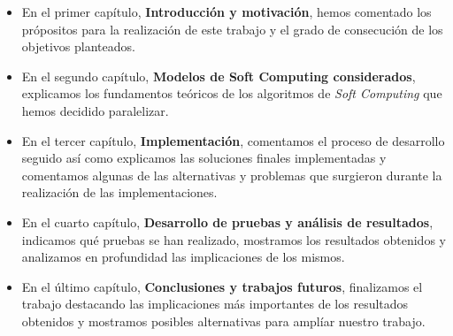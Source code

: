 \documentclass[a4paper,oneside,11pt,titlepage]{book}
\begin{document}
\begin{itemize}
    \item En el primer capítulo, \textbf{Introducción y motivación}, hemos comentado los própositos para la realización de este trabajo y el grado de consecución de los objetivos planteados.
    \item En el segundo capítulo, \textbf{Modelos de Soft Computing considerados}, explicamos los fundamentos teóricos de los algoritmos de \textit{Soft Computing} que hemos decidido paralelizar.
    \item En el tercer capítulo, \textbf{Implementación}, comentamos el proceso de desarrollo seguido así como explicamos las soluciones finales implementadas y comentamos algunas de las alternativas y problemas que surgieron durante la realización de las implementaciones.
    \item En el cuarto capítulo, \textbf{Desarrollo de pruebas y análisis de resultados}, indicamos qué pruebas se han realizado, mostramos los resultados obtenidos y analizamos en profundidad las implicaciones de los mismos.
    \item En el último capítulo, \textbf{Conclusiones y trabajos futuros}, finalizamos el trabajo destacando las implicaciones más importantes de los resultados obtenidos y mostramos posibles alternativas para amplíar nuestro trabajo.
\end{itemize}

%




%
%
%
%
%
%
%
%
%
%
%
%
%
%
%
%
%
%
%
%
%
% 
 
%

%
%
%

\thispagestyle{empty}
\end{document}
